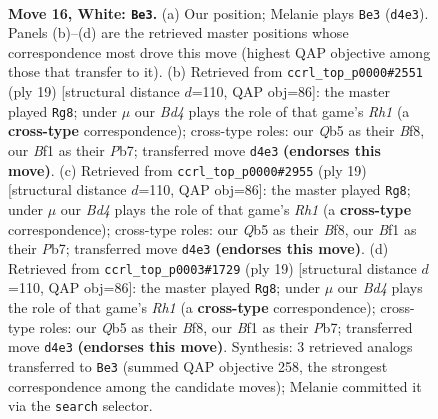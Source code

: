 \documentclass[11pt]{article}
\begin{document}
\begin{figure}[p]\centering
\begin{subfigure}{0.46\textwidth}\centering
\resizebox{\linewidth}{!}{%
\newchessgame
\chessboard[
  setfen={rnbq1kr1/1p2n3/4p3/1QPpPp2/p2B1Npp/P1P5/2P2PPP/R3KB1R w KQ - 2 16},
  showmover=false,
  pgfstyle=straightmove, color=movearrow, markmove={d4-e3}
]}
\caption{}
\end{subfigure}\hfill
\begin{subfigure}{0.46\textwidth}\centering
\resizebox{\linewidth}{!}{%
\newchessgame
\chessboard[
  setfen={r3kb1r/pp1b1p1p/1qn1p2p/3pP3/1P1P4/P4N2/R4PPP/1N1QKB1R b Kkq - 2 10},
  showmover=false,
  pgfstyle=straightmove, color=movearrow, markmove={h8-g8}
]}
\caption{}
\end{subfigure}
\\[4pt]
\begin{subfigure}{0.46\textwidth}\centering
\resizebox{\linewidth}{!}{%
\newchessgame
\chessboard[
  setfen={r3kb1r/pp1b1p1p/1qn1p2p/3pP3/1P1P4/P4N2/R4PPP/1N1QKB1R b Kkq - 2 10},
  showmover=false,
  pgfstyle=straightmove, color=movearrow, markmove={h8-g8}
]}
\caption{}
\end{subfigure}\hfill
\begin{subfigure}{0.46\textwidth}\centering
\resizebox{\linewidth}{!}{%
\newchessgame
\chessboard[
  setfen={r3kb1r/pp1b1p1p/1qn1p2p/3pP3/1P1P4/P4N2/R4PPP/1N1QKB1R b Kkq - 2 10},
  showmover=false,
  pgfstyle=straightmove, color=movearrow, markmove={h8-g8}
]}
\caption{}
\end{subfigure}
\caption{\textbf{Move 16, White: \texttt{Be3}.} (a) Our position; Melanie plays \texttt{Be3} (\texttt{d4e3}). Panels (b)--(d) are the retrieved master positions whose correspondence most drove this move (highest QAP objective among those that transfer to it). (b) Retrieved from \texttt{ccrl\_top\_p0000\#2551} (ply 19) [structural distance $d$=110, QAP obj=86]: the master played \texttt{Rg8}; under $\mu$ our \emph{Bd4} plays the role of that game's \emph{Rh1} (a \textbf{cross-type} correspondence); cross-type roles: our \emph{Q}b5 as their \emph{B}f8, our \emph{B}f1 as their \emph{P}b7; transferred move \texttt{d4e3} \textbf{(endorses this move)}. (c) Retrieved from \texttt{ccrl\_top\_p0000\#2955} (ply 19) [structural distance $d$=110, QAP obj=86]: the master played \texttt{Rg8}; under $\mu$ our \emph{Bd4} plays the role of that game's \emph{Rh1} (a \textbf{cross-type} correspondence); cross-type roles: our \emph{Q}b5 as their \emph{B}f8, our \emph{B}f1 as their \emph{P}b7; transferred move \texttt{d4e3} \textbf{(endorses this move)}. (d) Retrieved from \texttt{ccrl\_top\_p0003\#1729} (ply 19) [structural distance $d$=110, QAP obj=86]: the master played \texttt{Rg8}; under $\mu$ our \emph{Bd4} plays the role of that game's \emph{Rh1} (a \textbf{cross-type} correspondence); cross-type roles: our \emph{Q}b5 as their \emph{B}f8, our \emph{B}f1 as their \emph{P}b7; transferred move \texttt{d4e3} \textbf{(endorses this move)}. Synthesis: 3 retrieved analogs transferred to \texttt{Be3} (summed QAP objective 258, the strongest correspondence among the candidate moves); Melanie committed it via the \texttt{search} selector.}
\label{fig:thought-m30}
\end{figure}
\end{document}

